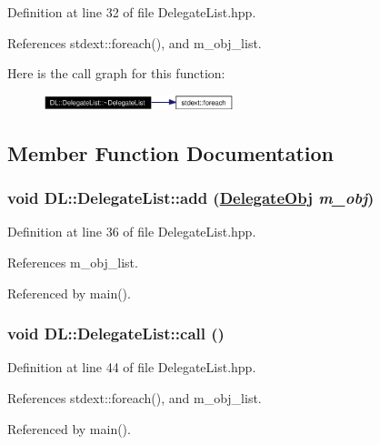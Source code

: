 Definition at line 32 of file Delegate\-List.hpp.

References stdext::foreach(), and m\_\-obj\_\-list.

Here is the call graph for this function:\begin{figure}[H]
\begin{center}
\leavevmode
\includegraphics[width=156pt]{classDL_1_1DelegateList_a0_cgraph}
\end{center}
\end{figure}


\subsection{Member Function Documentation}
\hypertarget{classDL_1_1DelegateList_a1}{
\subsubsection[add]{\setlength{\rightskip}{0pt plus 5cm}void DL::Delegate\-List::add (\hyperlink{namespaceDL_a0}{Delegate\-Obj} {\em m\_\-obj})}}
\label{classDL_1_1DelegateList_a1}




Definition at line 36 of file Delegate\-List.hpp.

References m\_\-obj\_\-list.

Referenced by main().\hypertarget{classDL_1_1DelegateList_a3}{
\subsubsection[call]{\setlength{\rightskip}{0pt plus 5cm}void DL::Delegate\-List::call ()}}
\label{classDL_1_1DelegateList_a3}




Definition at line 44 of file Delegate\-List.hpp.

References stdext::foreach(), and m\_\-obj\_\-list.

Referenced by main().

